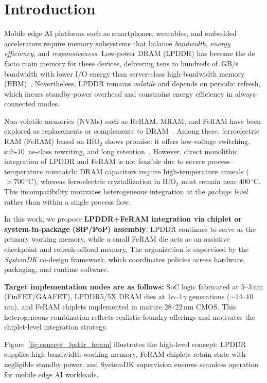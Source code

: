 \section{Introduction}

Mobile edge AI platforms such as smartphones, wearables, and embedded accelerators require memory subsystems that balance
\emph{bandwidth}, \emph{energy efficiency}, and \emph{responsiveness}.
Low-power DRAM (LPDDR) has become the de facto main memory for these devices, delivering tens to hundreds of~GB/s bandwidth
with lower I/O energy than server-class high-bandwidth memory (HBM)~\cite{ChoiIEDM2022}.
Nevertheless, LPDDR remains \emph{volatile} and depends on periodic refresh, which incurs standby-power overhead
and constrains energy efficiency in always-connected modes.

Non-volatile memories (NVMs) such as ReRAM, MRAM, and FeRAM have been explored as replacements or complements to DRAM~\cite{NohedaNRM2023,WongProcIEEE2012,IkedaNature2010,WeebitIEDM2022}.
Among these, ferroelectric RAM (FeRAM) based on HfO$_2$ shows promise: it offers low-voltage switching, sub-$10$~ns-class rewriting, and long retention~\cite{MullerAPL2011,KimIEDM2021}.
However, direct monolithic integration of LPDDR and FeRAM is not feasible due to severe process--temperature mismatch:
DRAM capacitors require high-temperature anneals ($>700\,^\circ\mathrm{C}$), whereas ferroelectric crystallization in HfO$_2$ must remain near $400\,^\circ\mathrm{C}$.
This incompatibility motivates heterogeneous integration at the \emph{package level} rather than within a single process flow.

In this work, we propose \textbf{LPDDR+FeRAM integration via chiplet or system-in-package (SiP/PoP) assembly}.
LPDDR continues to serve as the primary working memory, while a small FeRAM die acts as an assistive checkpoint and refresh-offload memory.
The organization is supervised by the \emph{SystemDK} co-design framework, which coordinates policies across hardware, packaging, and runtime software.

\textbf{Target implementation nodes are as follows:}
SoC logic fabricated at 5--3\,nm (FinFET/GAAFET),
LPDDR5/5X DRAM dies at 1$\alpha$--1$\gamma$ generations ($\sim$14--10\,nm),
and FeRAM chiplets implemented in mature 28--22\,nm CMOS.
This heterogeneous combination reflects realistic foundry offerings and motivates the chiplet-level integration strategy.

Figure~\ref{fig:concept_lpddr_feram} illustrates the high-level concept:
LPDDR supplies high-bandwidth working memory, FeRAM chiplets retain state with negligible standby power,
and SystemDK supervision ensures seamless operation for mobile edge AI workloads.


